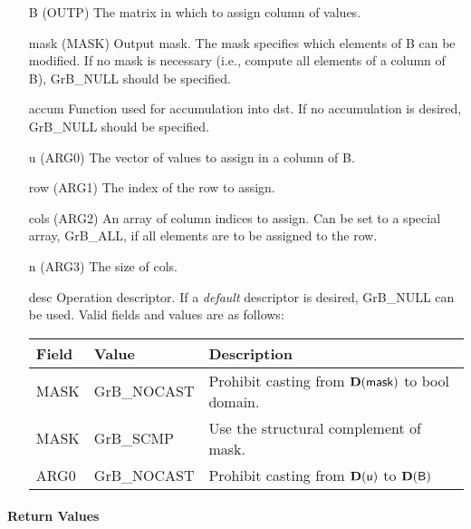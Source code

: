 \begin{itemize}[leftmargin=1.1in]
    \item[{\sf B}]   ({\sf OUTP}) The matrix in which to assign column of values.

    \item[{\sf mask}] ({\sf MASK}) Output mask. The mask specifies which elements
    of {\sf B} can be modified. If no mask is necessary (i.e., compute all
    elements of a column of {\sf B}), {\sf GrB\_NULL} should be specified.

    \item[{\sf accum}] Function used for accumulation into {\sf dst}.  If no accumulation
                        is desired, {\sf GrB\_NULL} should be specified.

    \item[{\sf u}]   ({\sf ARG0}) The vector of values to assign in a column of {\sf B}.

    \item[{\sf row}]     ({\sf ARG1}) The index of the row to assign.
    \item[{\sf cols}]     ({\sf ARG2}) An array of column indices to assign. Can
                              be set to a special array, {\sf GrB\_ALL}, if all elements
                              are to be assigned to the row.
    \item[{\sf n}]    ({\sf ARG3}) The size of {\sf cols}.

    \item[{\sf desc}]   Operation descriptor. If a
    \emph{default} descriptor is desired, {\sf GrB\_NULL} can be
    used. Valid fields and values are as follows: \\
    \begin{tabular}{lll}
    Field  & Value & Description \\
    \hline
    {\sf MASK} & {\sf GrB\_NOCAST} & Prohibit casting from $\bold{D}({\sf mask})$ to {\sf bool} domain. \\
    {\sf MASK} & {\sf GrB\_SCMP} & Use the structural complement of {\sf mask}. \\
    {\sf ARG0} & {\sf GrB\_NOCAST} & Prohibit casting from $\bold{D}({\sf u})$ to $\bold{D}({\sf B})$ \\
    \end{tabular}

\end{itemize}

\paragraph{Return Values}

